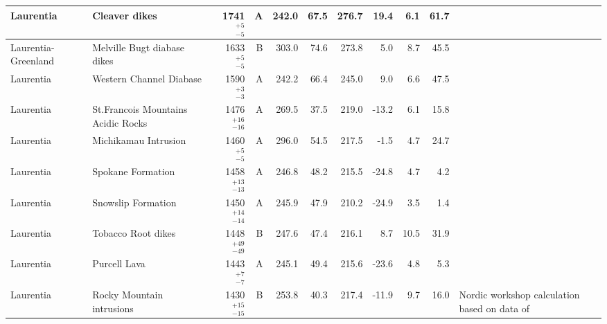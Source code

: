 \documentclass[twocolumn, switch]{article} %
\begin{document}
{\begin{landscape}
\begin{ThreePartTable}
\begin{longtable}{p{1.4 in}p{1.2 in}rrrrrrrrp{1.2 in}}
                     Laurentia &                                      Cleaver dikes &     1741$^{+5}_{-5}$ &      A &     242.0 &      67.5 & 276.7 &  19.4 &       6.1 &        61.7 &                                 \cite{Irving2004a} \\ \hline
           Laurentia-Greenland &                        Melville Bugt diabase dikes &     1633$^{+5}_{-5}$ &      B &     303.0 &      74.6 & 273.8 &   5.0 &       8.7 &        45.5 &                                  \cite{Halls2011a} \\ \hline
                     Laurentia &                            Western Channel Diabase &     1590$^{+3}_{-3}$ &      A &     242.2 &      66.4 & 245.0 &   9.0 &       6.6 &        47.5 &                                 \cite{Irving1972a} \\ \hline
                     Laurentia &                 St.Francois Mountains Acidic Rocks &   1476$^{+16}_{-16}$ &      A &     269.5 &      37.5 & 219.0 & -13.2 &       6.1 &        15.8 &                                  \cite{Meert2002b} \\ \hline
                     Laurentia &                               Michikamau Intrusion &     1460$^{+5}_{-5}$ &      A &     296.0 &      54.5 & 217.5 &  -1.5 &       4.7 &        24.7 &                                 \cite{Emslie1976a} \\ \hline
                     Laurentia &                                  Spokane Formation &   1458$^{+13}_{-13}$ &      A &     246.8 &      48.2 & 215.5 & -24.8 &       4.7 &         4.2 &                                 \cite{Elston2002a} \\ \hline
                     Laurentia &                                 Snowslip Formation &   1450$^{+14}_{-14}$ &      A &     245.9 &      47.9 & 210.2 & -24.9 &       3.5 &         1.4 &                                 \cite{Elston2002a} \\ \hline
                     Laurentia &                                 Tobacco Root dikes &   1448$^{+49}_{-49}$ &      B &     247.6 &      47.4 & 216.1 &   8.7 &      10.5 &        31.9 &                                 \cite{Harlan2008a} \\ \hline
                     Laurentia &                                       Purcell Lava &     1443$^{+7}_{-7}$ &      A &     245.1 &      49.4 & 215.6 & -23.6 &       4.8 &         5.3 &                                 \cite{Elston2002a} \\ \hline
                     Laurentia &                          Rocky Mountain intrusions &   1430$^{+15}_{-15}$ &      B &     253.8 &      40.3 & 217.4 & -11.9 &       9.7 &        16.0 &  Nordic workshop calculation based on data of \cite{Harlan1994a,Harlan1998a} \\ \hline

\end{longtable}
\end{ThreePartTable}
\end{landscape}}
\end{document}
